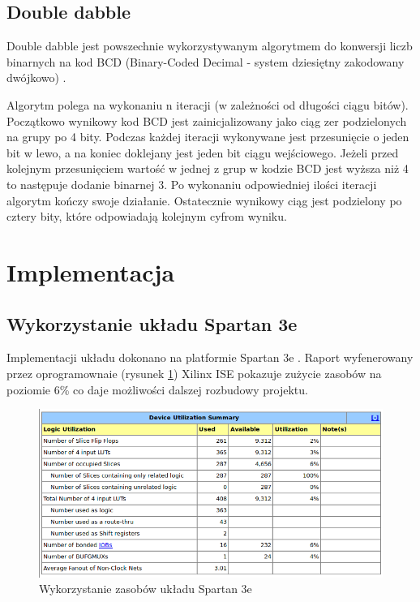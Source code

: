 \documentclass[a4paper]{article}
\begin{document}
\subsection{Double dabble}
Double dabble jest powszechnie wykorzystywanym algorytmem do konwersji liczb binarnych na kod BCD (Binary-Coded Decimal - system dziesiętny zakodowany dwójkowo) \cite{bib_dabble}. 

Algorytm polega na wykonaniu n iteracji (w zależności od długości ciągu bitów). Początkowo wynikowy kod BCD jest zainicjalizowany jako ciąg zer podzielonych na grupy po 4 bity. Podczas każdej iteracji wykonywane jest przesunięcie o jeden bit w lewo, a na koniec doklejany jest jeden bit ciągu wejściowego. Jeżeli przed kolejnym przesunięciem wartość w jednej z grup w kodzie BCD jest wyższa niż 4 to następuje dodanie binarnej 3. Po wykonaniu odpowiedniej ilości iteracji algorytm kończy swoje działanie. Ostatecznie wynikowy ciąg jest podzielony po cztery bity, które odpowiadają kolejnym cyfrom wyniku. 

\section{Implementacja}

\subsection{Wykorzystanie układu Spartan 3e}

Implementacji układu dokonano na platformie Spartan 3e \cite{bib_spartan}. Raport wyfenerowany przez oprogramownaie (rysunek \ref{raport}) Xilinx ISE pokazuje zużycie zasobów na poziomie 6\% co daje możliwości dalszej rozbudowy projektu.

\begin{figure}[H]
\begin{center}
\includegraphics[width=14cm]{graphics/summary.png}
\end{center}
\caption{Wykorzystanie zasobów układu Spartan 3e}
\label{raport}
\end{figure}
\end{document}
